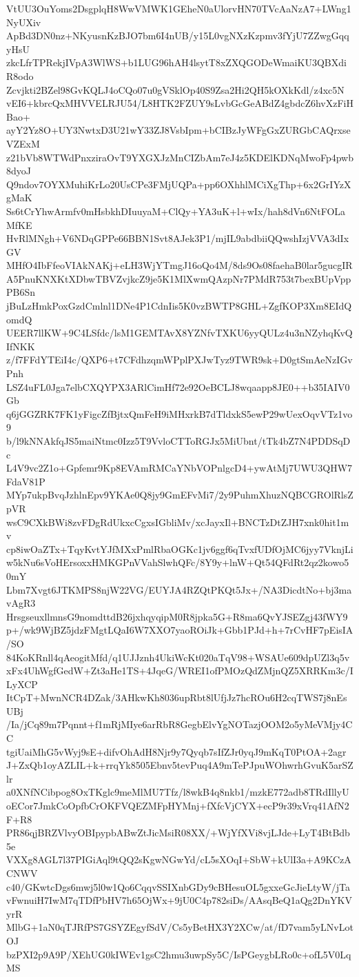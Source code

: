 VtUU3OuYoms2DsgplqH8WwVMWK1GEheN0aUlorvHN70TVcAaNzA7+LWng1NyUXiv
ApBd3DN0nz+NKyusnKzBJO7bm6I4nUB/y15L0vgNXzKzpmv3fYjU7ZZwgGqqyHsU
zkcLfrTPRekjIVpA3WlWS+b1LUG96hAH4lsytT8xZXQGODeWmaiKU3QBXdiR8odo
Zcvjkti2BZel98GvKQLJ4oCQo07u0gVSklOp40S9Zsa2Hi2QH5kOXkKdl/z4xc5N
vEI6+kbrcQxMHVVELRJU54/L8HTK2FZUY9sLvbGcGeABdZ4gbdcZ6hvXzFiHBao+
ayY2Yz8O+UY3NwtxD3U21wY33ZJ8VsbIpm+bCIBzJyWFgGxZURGbCAQrxseVZExM
z21bVb8WTWdPnxziraOvT9YXGXJzMnCIZbAm7eJ4z5KDElKDNqMwoFp4pwb8dyoJ
Q9ndov7OYXMuhiKrLo20UsCPe3FMjUQPa+pp6OXhhlMCiXgThp+6x2GrIYzXgMaK
Ss6tCrYhwArmfv0mHsbkhDIuuyaM+ClQy+YA3uK+l+wIx/hah8dVn6NtFOLaMfKE
HvRlMNgh+V6NDqGPPe66BBN1Svt8AJek3P1/mjIL9abdbiiQQwshIzjVVA3dIxGV
MHfO4IbFfeoVIAkNAKj+eLH3WjYTmgJ16oQo4M/8ds9Os08faehaB0lar5gucgIR
A5PnuKNXKtXDbwTBVZvjkcZ9je5K1MlXwmQAzpNr7PMdR753t7bexBUpVppPB6Sn
jBuLzHmkPoxGzdCmlnl1DNe4P1CdnIis5K0vzBWTP8GHL+ZgfKOP3Xm8EIdQomdQ
UEER7llKW+9C4LSfdc/lsM1GEMTAvX8YZNfvTXKU6yyQULz4u3nNZyhqKvQIfNKK
z/f7FFdYTEiI4c/QXP6+t7CFdhzqmWPplPXJwTyz9TWR9sk+D0gtSmAeNzIGvPnh
LSZ4uFL0Jga7elbCXQYPX3ARlCimHf72e92OeBCLJ8wqaapp8JE0++b35IAIV0Gb
q6jGGZRK7FK1yFigcZfBjtxQmFeH9iMHxrkB7dTldxkS5ewP29wUexOqvVTz1vo9
b/l9kNNAkfqJS5maiNtmc0Izz5T9VvloCTToRGJx5MiUbnt/tTk4bZ7N4PDDSqDc
L4V9vc2Z1o+Gpfemr9Kp8EVAmRMCaYNbVOPnlgcD4+ywAtMj7UWU3QHW7FdaV81P
MYp7ukpBvqJzhlnEpv9YKAe0Q8jy9GmEFvMi7/2y9PuhmXhuzNQBCGROlRlsZpVR
wsC9CXkBWi8zvFDgRdUkxcCgxsIGbliMv/xcJayxIl+BNCTzDtZJH7xnk0hit1mv
cp8iwOaZTx+TqyKvtYJfMXxPmlRbaOGKc1jv6ggf6qTvxfUDfOjMC6jyy7VknjLi
w5kNu6sVoHErsoxxHMKGPnVVahSlwhQFc/8Y9y+lnW+Qt54QFdRt2qz2kowo50mY
Lbm7Xvgt6JTKMPS8njW22VG/EUYJA4RZQtPKQt5Jx+/NA3DicdtNo+bj3mavAgR3
HrsgseuxllmnsG9nomdttdB26jxhqyqipM0R8jpka5G+R8ma6QvYJSEZgj43fWY9
p+/wk9WjBZ5jdzFMgtLQaI6W7XXO7yaoROiJk+Gbb1PJd+h+7rCvHF7pEisIA/SO
84KoKRnll4qAeogitMfd/q1UJJznh4UkiWcKt020aTqV98+WSAUe609dpUZl3q5v
xFx4UhWgfGedW+Zt3aHe1TS+4JqeG/WREI1ofPMOzQdZMjnQZ5XRRKm3c/ILyXCP
ItCpT+MwnNCR4DZak/3AHkwKh8036upRbt8lUfjJz7hcROu6H2cqTWS7j8nEsUBj
/Ia/jCq89m7Pqnnt+f1mRjMIye6arRbR8GegbElvYgNOTazjOOM2o5yMeVMjy4CC
tgiUaiMhG5vWyj9sE+difvOhAdH8Njr9y7Qyqb7sIfZJr0yqJ9mKqT0PtOA+2agr
J+ZxQb1oyAZLIL+k+rrqYk8505Ebnv5tevPuq4A9mTePJpuWOhwrhGvuK5arSZlr
a0XNfNCibpog8OxTKglc9meMlMU7Tfz/l8wkB4q8nkb1/mzkE772adb8TRdIllyU
oECor7JmkCoOpfbCrOKFVQEZMFpHYMnj+fXfcVjCYX+ecP9r39xVrq41AfN2F+R8
PR86qjBRZVlvyOBIpypbABwZtJicMsiR08XX/+WjYfXVi8vjLJde+LyT4BtBdb5e
VXXg8AGL7l37PIGiAql9tQQ2sKgwNGwYd/cL5sXOqI+SbW+kUlI3a+A9KCzACNWV
c40/GKwtcDgs6mwj5l0w1Qo6CqqvSSIXnbGDy9cBHesuOL5gxxeGcJieLtyW/jTa
vFwnuiH7IwM7qTDfPbHV7h65OjWx+9jU0C4p782siDs/AAsqBeQ1aQg2DnYKVyrR
MlbG+1aN0qTJRfPS7GSYZEgyfSdV/Cs5yBetHX3Y2XCw/at/fD7vam5yLNvLotOJ
bzPXI2p9A9P/XEhUG0kIWEv1gsC2hmu3uwpSy5C/IsPGeygbLRo0c+ofL5V0LqMS
